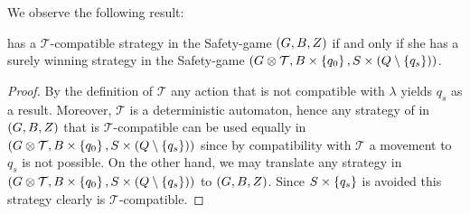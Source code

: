 We observe the following result:
\begin{lemma}
  \eve{} has a $\mathcal{T}$-compatible strategy in the Safety-game
  $\left(G, B, Z\right)$ if and only if she has a surely winning
  strategy in the Safety-game 
  $\left(G\otimes\mathcal{T}, B\times\left\{q_{0}\right\}, 
    S\times\left(Q\setminus\left\{q_{s}\right\}\right)\right)$.
  \label{lem:TembeddedG}
\end{lemma}
\begin{proof}
  By the definition of $\mathcal{T}$ any action that is not compatible with 
  $\lambda$ yields $q_{s}$ as a result. Moreover, $\mathcal{T}$ is a
  deterministic automaton, hence any strategy of \eve{} in $\left(G, B, Z\right)$ 
  that is $\mathcal{T}$-compatible can be used equally in 
  $\left(G\otimes\mathcal{T}, B\times\left\{q_{0}\right\}, 
    S\times\left(Q\setminus\left\{q_{s}\right\}\right)\right)$ since by compatibility with 
  $\mathcal{T}$ a movement to $q_{s}$ is not possible. On the other hand, we 
  may translate any strategy in $\left(G\otimes\mathcal{T}, 
  B\times\left\{q_{0}\right\}, S\times\left(Q\setminus\left\{q_{s}\right\}\right)\right)$ to 
  $\left(G, B, Z\right)$. Since $S\times\left\{q_{s}\right\}$ is avoided this strategy 
  clearly is $\mathcal{T}$-compatible.
\end{proof}

